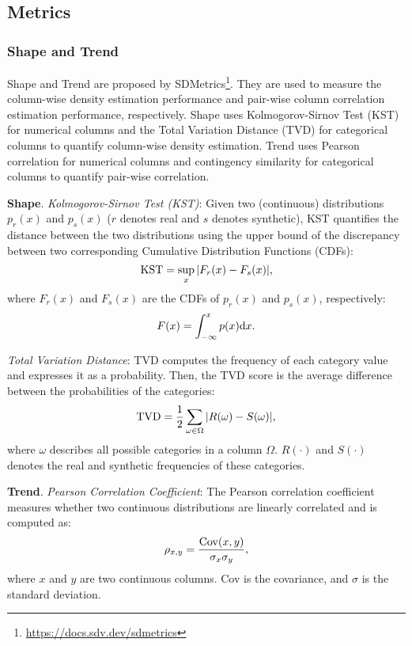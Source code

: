 \subsection{Metrics}\label{appendix:metrics}

\subsubsection{Shape and Trend}
Shape and Trend are proposed by SDMetrics\footnote{\url{https://docs.sdv.dev/sdmetrics}}. They are used to measure the column-wise density estimation performance and pair-wise column correlation estimation performance, respectively. Shape uses Kolmogorov-Sirnov Test (KST) for numerical columns and the Total Variation Distance (TVD) for categorical columns to quantify column-wise density estimation. Trend uses Pearson correlation for numerical columns and contingency similarity for categorical columns to quantify pair-wise correlation. 

\textbf{Shape}. \textit{Kolmogorov-Sirnov Test (KST)}: Given two (continuous) distributions $p_r(x)$ and $p_s(x)$ ($r$ denotes real and $s$ denotes synthetic), KST quantifies the distance between the two distributions using the upper bound of the discrepancy between two corresponding Cumulative Distribution Functions (CDFs):
\begin{equation}
    {\rm KST} = \sup\limits_{x}  | F_r(x) - F_s(x) |,
\end{equation}
where $F_r(x)$ and $F_s(x)$ are the CDFs of $p_r(x)$ and $p_s(x)$, respectively:
\begin{equation}
    F(x) = \int_{-\infty}^x p(x) {\rm d} x.
\end{equation}

\textit{Total Variation Distance}: TVD computes the frequency of each category value and expresses it as a probability. Then, the TVD score is the average difference between the probabilities of the categories:
\begin{equation}
    {\rm TVD} = \frac{1}{2} \sum\limits_{\omega \in \Omega} |R(\omega) - S(\omega)|,
\end{equation}
where $\omega$ describes all possible categories in a column $\Omega$. $R(\cdot)$ and $S(\cdot)$ denotes the real and synthetic frequencies of these categories.

\textbf{Trend}. \textit{Pearson Correlation Coefficient}: The Pearson correlation coefficient measures whether two continuous distributions are linearly correlated and is computed as:
\begin{equation}
    \rho_{x, y}  = \frac{ {\rm Cov} (x, y)}{\sigma_x \sigma_y},
\end{equation}
where $x$ and $y$ are two continuous columns. Cov is the covariance, and $\sigma$ is the standard deviation. 


